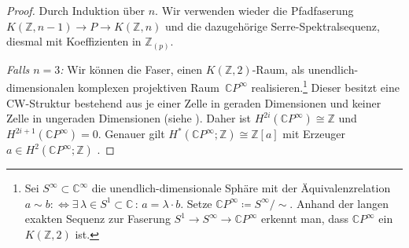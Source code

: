 \documentclass[11pt, a4paper, german]{article}
\theoremstyle{definition}
\theoremstyle{remark}
\newcommand{\Z}{\mathbb{Z}} %
\newcommand{\C}{\mathbb{C}} %
\begin{document}
\begin{proof}
  Durch Induktion über $n$.
  Wir verwenden wieder die Pfadfaserung $K(\Z, n-1) \to P \to K(\Z, n)$ und die dazugehörige Serre-Spektralsequenz, diesmal mit Koeffizienten in $\Z_{(p)}$.
  
  \emph{Falls $n = 3$:} \enspace
  Wir können die Faser, einen $K(\Z, 2)$-Raum, als unendlich-dimensionalen komplexen projektiven Raum~$\C P^\infty$ realisieren.\footnote{
    Sei $S^\infty \subset \C^\infty$ die unendlich-dimensionale Sphäre mit der Äquivalenzrelation $a \sim b :\!\iff \exists \, \lambda \in S^1 \subset \C \,:\, a = \lambda \cdot b$. Setze $\C P^\infty \coloneqq S^\infty / {\sim}$.
    Anhand der langen exakten Sequenz zur Faserung $S^1 \to S^\infty \to \C P^\infty$ erkennt man, dass $\C P^\infty$ ein $K(\Z, 2)$ ist.
  }
  Dieser besitzt eine CW-Struktur bestehend aus je einer Zelle in geraden Dimensionen und keiner Zelle in ungeraden Dimensionen (siehe \cite[\mbox{} Bsp 0.6]{hatcher:at}).
  Daher ist $H^{2i}(\C P^\infty) \cong \Z$ und $H^{2i+1}(\C P^\infty) = 0$.
  Genauer gilt $H^*(\C P^\infty; \Z) \cong \Z[a]$ mit Erzeuger $a \in H^2(\C P^\infty; \Z)$ \cite[\mbox{} Thm 3.12]{hatcher:at}.


\end{proof}
\end{document}
